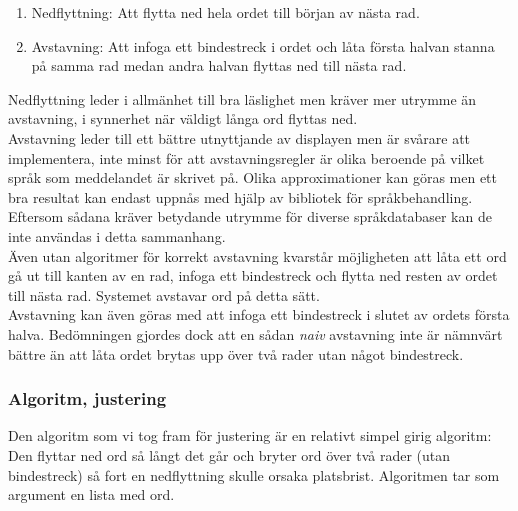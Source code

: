 \documentclass[a4paper,11pt]{article}
\begin{document}
	\begin{enumerate}
    	\item Nedflyttning: Att flytta ned hela ordet till början av nästa rad.
    	\item Avstavning: Att infoga ett bindestreck i ordet och låta första halvan stanna på samma rad medan andra halvan flyttas ned till nästa rad.
	\end{enumerate}

Nedflyttning leder i allmänhet till bra läslighet men kräver mer utrymme än avstavning, i synnerhet när väldigt långa ord flyttas ned. \\

Avstavning leder till ett bättre utnyttjande av displayen men är svårare att implementera, inte minst för att avstavningsregler är olika beroende på vilket språk som meddelandet är skrivet på. Olika approximationer kan göras men ett bra resultat kan endast uppnås med hjälp av bibliotek för språkbehandling. Eftersom sådana kräver betydande utrymme för diverse språkdatabaser kan de inte användas i detta sammanhang. \\
    
Även utan algoritmer för korrekt avstavning kvarstår möjligheten att låta ett ord gå ut till kanten av en rad, infoga ett bindestreck och flytta ned resten av ordet till nästa rad. Systemet avstavar ord på detta sätt. \\

Avstavning kan även göras med att infoga ett bindestreck i slutet av ordets första halva. Bedömningen gjordes dock att en sådan {\it naiv} avstavning inte är nämnvärt bättre än att låta ordet brytas upp över två rader utan något bindestreck.

\subsubsection{Algoritm, justering}
Den algoritm som vi tog fram för justering är en relativt simpel girig algoritm: Den flyttar ned ord så långt det går och bryter ord över två rader (utan bindestreck) så fort en nedflyttning skulle orsaka platsbrist. Algoritmen tar som argument en lista med ord. \\
\end{document}
